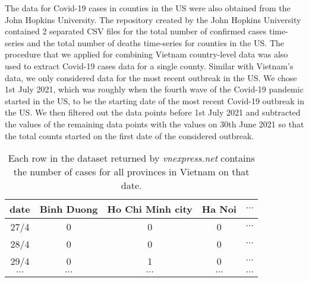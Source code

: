 The data for Covid-19 cases in counties in the \gls{US} were also obtained from the John Hopkins University.
The repository created by the John Hopkins University \cite{dongInteractiveWebbasedDashboard2020} contained 2 separated CSV files for the total number of confirmed cases time-series and the total number of deaths time-series for counties in the \gls{US}.
The procedure that we applied for combining Vietnam country-level data was also used to extract Covid-19 cases data for a single county.
Similar with Vietnam's data, we only considered data for the most recent outbreak in the \gls{US}.
We chose 1st July 2021, which was roughly when the fourth wave of the Covid-19 pandemic started in the \gls{US}, to be the starting date of the most recent Covid-19 outbreak in the US.
We then filtered out the data points before 1st July 2021 and subtracted the values of the remaining data points with the values on 30th June 2021 so that the total counts started on the first date of the considered outbreak.

\begin{table}[h]
\centering
\begin{tabular}{|c | c | c | c | c }
    date & Binh Duong & Ho Chi Minh city & Ha Noi & $\cdots$ \\
    \hline\hline
    27/4 & 0 & 0 & 0 & $\cdots$ \\
    \hline
    28/4 & 0 & 0 & 0 & $\cdots$ \\
    \hline
    29/4 & 0 & 1 & 0 & $\cdots$ \\
    \hline
    $\cdots$ & $\cdots$ & $\cdots$ & $\cdots$ & $\cdots$ \\
\end{tabular}
\caption{Each row in the dataset returned by \textit{vnexpress.net} contains the number of cases for all provinces in Vietnam on that date.}
\label{tab:vietnam-provinces-timeseries}
\end{table}

